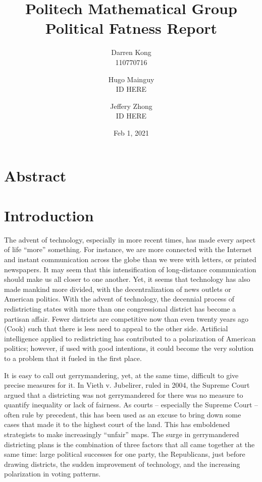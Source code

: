 \documentclass[letterpaper]{article}
\title{
	\textbf{Politech Mathematical Group} \\ 
	\vspace{2ex} 
	Political Fatness Report
	\vspace{2ex}
}
\author{
	Darren Kong \\ 110770716
	\and 
	Hugo Mainguy \\ ID HERE
	\and 
	Jeffery Zhong \\ ID HERE
	\vspace{3ex}
}
\date{Feb 1, 2021}
\begin{document}
\begin{titlepage}
\maketitle
\thispagestyle{empty}
\end{titlepage}

\section{Abstract}
\section{Introduction}

The advent of technology, especially in more recent times, has made every aspect of life “more” something. For instance, we are more connected with the Internet and instant communication across the globe than we were with letters, or printed newspapers. It may seem that this intensification of long-distance communication should make us all closer to one another. Yet, it seems that technology has also made mankind more divided, with the decentralization of news outlets or American politics. With the advent of technology, the decennial process of redistricting states with more than one congressional district has become a partisan affair. Fewer districts are competitive now than even twenty years ago (Cook) such that there is less need to appeal to the other side. Artificial intelligence applied to redistricting has contributed to a polarization of American politics; however, if used with good intentions, it could become the very solution to a problem that it fueled in the first place.

It is easy to call out gerrymandering, yet, at the same time, difficult to give precise measures for it. In Vieth v. Jubelirer, ruled in 2004, the Supreme Court argued that a districting was not gerrymandered for there was no measure to quantify inequality or lack of fairness. As courts – especially the Supreme Court – often rule by precedent, this has been used as an excuse to bring down some cases that made it to the highest court of the land. This has emboldened strategists to make increasingly “unfair” maps. The surge in gerrymandered districting plans is the combination of three factors that all came together at the same time: large political successes for one party, the Republicans, just before drawing districts, the sudden improvement of technology, and the increasing polarization in voting patterns. 
\end{document}
